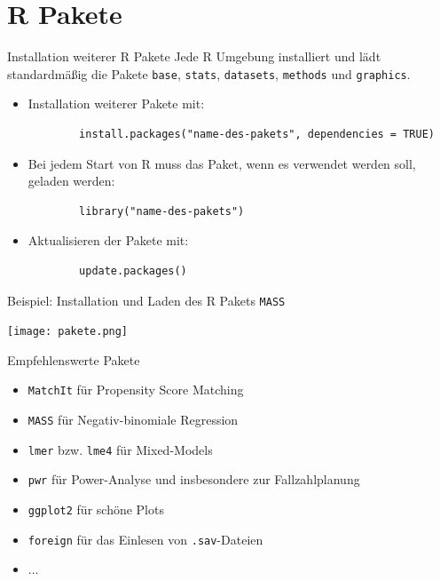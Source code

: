 \documentclass[xcolor=dvipsnames, aspectratio = 169]{beamer}
\begin{document}
\section{\textsf R Pakete}


\begin{frame}[fragile]{Installation weiterer \textsf R Pakete}
    Jede \textsf R Umgebung installiert und lädt standardmäßig die Pakete \texttt{base}, \texttt{stats}, \texttt{datasets}, \texttt{methods} und \texttt{graphics}.\bigskip
    \begin{itemize}
        \item Installation weiterer Pakete mit:
        \begin{verbatim}
        install.packages("name-des-pakets", dependencies = TRUE)
        \end{verbatim}
        \item Bei jedem Start von \textsf R muss das Paket, wenn es verwendet werden soll, geladen werden:
        \begin{verbatim}
        library("name-des-pakets")
        \end{verbatim}
        \item Aktualisieren der Pakete mit:
        \begin{verbatim}
        update.packages()
        \end{verbatim}
    \end{itemize}
\end{frame}

\begin{frame}{Beispiel: Installation und Laden des \textsf R Pakets \texttt{MASS}}
    \begin{center}
        \texttt{[image: pakete.png]}
    \end{center}
\end{frame}

\begin{frame}[fragile]{Empfehlenswerte Pakete}
      \begin{itemize}
          \item \verb+MatchIt+ für Propensity Score Matching 
          \item \verb+MASS+ für Negativ-binomiale Regression \\
          \item \verb+lmer+ bzw. \verb+lme4+ für Mixed-Models \\
          \item \verb+pwr+ für Power-Analyse und insbesondere zur Fallzahlplanung \\
         \item \verb+ggplot2+ für schöne Plots \\
      \item \verb+foreign+ für das Einlesen von \verb+.sav+-Dateien \\ 
      \item ...
   \end{itemize}
\end{frame}
\end{document}
